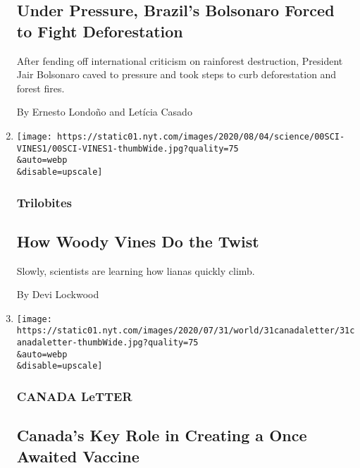 \begin{enumerate}
  \hypertarget{under-pressure-brazils-bolsonaro-forced-to-fight-deforestation}{%
  \subsection{Under Pressure, Brazil's Bolsonaro Forced to Fight
  Deforestation}\label{under-pressure-brazils-bolsonaro-forced-to-fight-deforestation}}

  After fending off international criticism on rainforest destruction,
  President Jair Bolsonaro caved to pressure and took steps to curb
  deforestation and forest fires.

  By Ernesto Londoño and Letícia Casado
\item
  \href{/2020/08/01/science/vines-lianas-panama.html}{}

  \texttt{[image: https://static01.nyt.com/images/2020/08/04/science/00SCI-VINES1/00SCI-VINES1-thumbWide.jpg?quality=75\\\&auto=webp\\\&disable=upscale]}

  \hypertarget{trilobites}{%
  \subsubsection{Trilobites}\label{trilobites}}

  \hypertarget{how-woody-vines-do-the-twist}{%
  \subsection{How Woody Vines Do the
  Twist}\label{how-woody-vines-do-the-twist}}

  Slowly, scientists are learning how lianas quickly climb.

  By Devi Lockwood
\item
  \href{/2020/07/31/world/canada/leone-farrell-chemist.html}{}

  \texttt{[image: https://static01.nyt.com/images/2020/07/31/world/31canadaletter/31canadaletter-thumbWide.jpg?quality=75\\\&auto=webp\\\&disable=upscale]}

  \hypertarget{canada-letter}{%
  \subsubsection{CANADA LeTTER}\label{canada-letter}}

  \hypertarget{canadas-key-role-in-creating-a-once-awaited-vaccine}{%
  \subsection{Canada's Key Role in Creating a Once Awaited
  Vaccine}\label{canadas-key-role-in-creating-a-once-awaited-vaccine}}


\end{enumerate}
